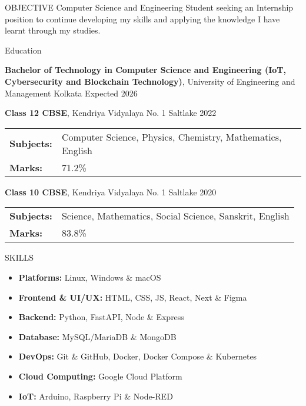 \documentclass{resume}
\begin{document}
\vspace{0.8em}

\begin{rSection}{OBJECTIVE}
{Computer Science and Engineering Student seeking an Internship position to continue developing my skills and applying the knowledge I have learnt through my studies.}

\end{rSection}
\vspace{0.8em}
\begin{rSection}{Education}

{\bf Bachelor of Technology in Computer Science and Engineering (IoT, Cybersecurity and Blockchain Technology)}, University of Engineering and Management Kolkata \hfill {Expected 2026}\\
\vspace{1em}

{\bf Class 12 CBSE}, Kendriya Vidyalaya No. 1 Saltlake \hfill {2022}\\
\begin{tabular}{>{\bfseries}l l}
Subjects: & Computer Science, Physics, Chemistry, Mathematics, English \\
Marks: & 71.2\%
\end{tabular}

{\bf Class 10 CBSE}, Kendriya Vidyalaya No. 1 Saltlake \hfill {2020}
\begin{tabular}{>{\bfseries}l l}
Subjects: & Science, Mathematics, Social Science, Sanskrit, English \\
Marks: & 83.8\%
\end{tabular}
\end{rSection}
\vspace{0.8em}

\begin{rSection}{SKILLS}
\begin{itemize}
    \item \textbf{Platforms:} Linux, Windows \& macOS
    \item \textbf{Frontend \& UI/UX: } HTML, CSS, JS, React, Next \& Figma
    \item \textbf{Backend: } Python, FastAPI, Node \& Express
    \item \textbf{Database: } MySQL/MariaDB \& MongoDB
    \item \textbf{DevOps:} Git \& GitHub, Docker, Docker Compose \& Kubernetes
    \item \textbf{Cloud Computing:} Google Cloud Platform
    \item \textbf{IoT:} Arduino, Raspberry Pi \& Node-RED
\end{itemize}
\end{rSection}
\vspace{0.8em}
\end{document}
